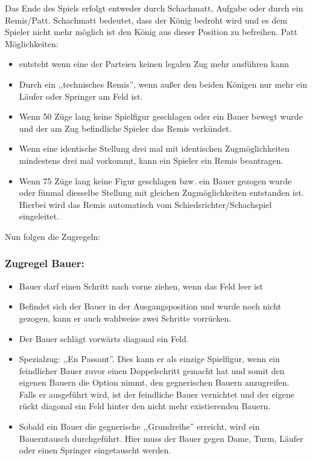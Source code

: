 \documentclass[12pt,a4paper]{article}
\begin{document}
{Das Ende des Spiels erfolgt entweder durch Schachmatt, Aufgabe oder durch ein Remis/Patt. Schachmatt bedeutet, dass der König bedroht wird und es dem Spieler nicht mehr möglich ist den König aus dieser Position zu befreihen.
Patt Möglichkeiten:
\begin{itemize}
	\item{ entsteht wenn eine der Parteien keinen legalen Zug mehr ausführen kann }
	\item{Durch ein ,,technisches Remis'', wenn außer den beiden Königen nur mehr ein Läufer oder Springer am Feld ist.}
	\item{Wenn 50 Züge lang keine Spielfigur geschlagen oder ein Bauer bewegt wurde und der am Zug befindliche Spieler das Remis verkündet.}
	\item{Wenn eine identische Stellung drei mal mit identischen Zugmöglichkeiten mindestens drei mal vorkommt, kann ein Spieler ein Remis beantragen.}
	\item{Wenn 75 Züge lang keine Figur geschlagen bzw. ein Bauer gezogen wurde oder fünmal diesselbe Stellung mit gleichen Zugmöglichkeiten entstanden ist. Hierbei wird das Remis automatisch vom Schiedsrichter/Schachspiel eingeleitet.}
\end{itemize}

Nun folgen die Zugregeln:

\subsubsection{Zugregel Bauer:}
\begin{itemize}
	\item{Bauer darf einen Schritt nach vorne ziehen, wenn das Feld leer ist}
	\item{Befindet sich der Bauer in der Ausgangsposition und wurde noch nicht gezogen, kann er auch wahlweise zwei Schritte vorrücken.}
	\item{Der Bauer schlägt vorwärts diagonal ein Feld.}
	\item{Spezialzug: ,,En Passant''. Dies kann er als einzige Spielfigur, wenn ein feindlicher Bauer zuvor einen Doppelschritt gemacht hat und somit den eigenen Bauern die Option nimmt, den gegnerischen Bauern anzugreifen. Falls er ausgeführt wird, ist der feindliche Bauer vernichtet und der eigene rückt diagonal ein Feld hinter den nicht mehr existierenden Bauern.}
	\item{Sobald ein Bauer die gegnerische ,,Grundreihe'' erreicht, wird ein Bauerntausch durchgeführt. Hier muss der Bauer gegen Dame, Turm, Läufer oder einen Springer eingetauscht werden.}
\end{itemize}

}
\end{document}
